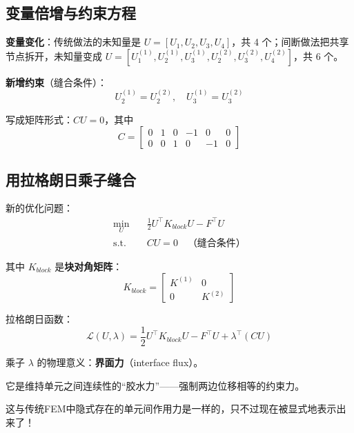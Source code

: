 \subsection{变量倍增与约束方程}

\textbf{变量变化}：传统做法的未知量是 $U = [U_1, U_2, U_3, U_4]$，共 4 个；间断做法把共享节点拆开，未知量变成 $U = [U_1^{(1)}, U_2^{(1)}, U_3^{(1)}, U_2^{(2)}, U_3^{(2)}, U_4^{(2)}]$，共 6 个。

\textbf{新增约束}（缝合条件）：
\begin{equation}
U_2^{(1)} = U_2^{(2)}, \quad U_3^{(1)} = U_3^{(2)}
\end{equation}

写成矩阵形式：$CU = 0$，其中
\begin{equation}
C = \begin{bmatrix}
0 & 1 & 0 & -1 & 0 & 0 \\
0 & 0 & 1 & 0 & -1 & 0
\end{bmatrix}
\end{equation}

\subsection{用拉格朗日乘子缝合}

新的优化问题：
\begin{align}
\min_U \quad & \frac{1}{2}U^\top K_{block} U - F^\top U \\
\text{s.t.} \quad & CU = 0 \quad \text{（缝合条件）}
\end{align}

其中 $K_{block}$ 是\textbf{块对角矩阵}：
\begin{equation}
K_{block} = \begin{bmatrix}
K^{(1)} & 0 \\
0 & K^{(2)}
\end{bmatrix}
\end{equation}

拉格朗日函数：
\begin{equation}
\mathcal{L}(U, \lambda) = \frac{1}{2}U^\top K_{block} U - F^\top U + \lambda^\top (CU)
\end{equation}

\begin{physicalmeaning}
乘子 $\lambda$ 的物理意义：\textbf{界面力}（interface flux）。

它是维持单元之间连续性的“胶水力”——强制两边位移相等的约束力。

这与传统FEM中隐式存在的单元间作用力是一样的，只不过现在被显式地表示出来了！
\end{physicalmeaning}

